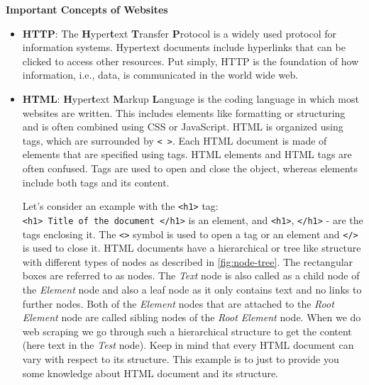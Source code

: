 \documentclass[
]{book}
\begin{document}
\textbf{Important Concepts of Websites}

\begin{itemize}
\item
  \textbf{HTTP}: The \textbf{H}yper\textbf{t}ext \textbf{T}ransfer \textbf{P}rotocol is a widely used protocol for information systems. Hypertext documents include hyperlinks that can be clicked to access other resources. Put simply, HTTP is the foundation of how information, i.e., data, is communicated in the world wide web.
\item
  \textbf{HTML}: \textbf{H}yper\textbf{t}ext \textbf{M}arkup \textbf{L}anguage is the coding language in which most websites are written. This includes elements like formatting or structuring and is often combined using CSS or JavaScript. HTML is organized using tags, which are surrounded by \texttt{\textless{}\ \textgreater{}}. Each HTML document is made of elements that are specified using tags. HTML elements and HTML tags are often confused. Tags are used to open and close the object, whereas elements include both tags and its content.

  Let's consider an example with the \texttt{\textless{}h1\textgreater{}} tag: \texttt{\textless{}h1\textgreater{}\ Title\ of\ the\ document\ \textless{}/h1\textgreater{}} is an element, and \texttt{\textless{}h1\textgreater{}}, \texttt{\textless{}/h1\textgreater{}} - are the tags enclosing it. The \texttt{\textless{}\textgreater{}} symbol is used to open a tag or an element and \texttt{\textless{}/\textgreater{}} is used to close it. HTML documents have a hierarchical or tree like structure with different types of nodes as described in \ref{fig:node-tree}. The rectangular boxes are referred to as nodes. The \emph{Text} node is also called as a child node of the \emph{Element} node and also a leaf node as it only contains text and no links to further nodes. Both of the \emph{Element} nodes that are attached to the \emph{Root Element} node are called sibling nodes of the \emph{Root Element} node. When we do web scraping we go through such a hierarchical structure to get the content (here text in the \emph{Test} node). Keep in mind that every HTML document can vary with respect to its structure. This example is to just to provide you some knowledge about HTML document and its structure.
\end{itemize}
\end{document}
